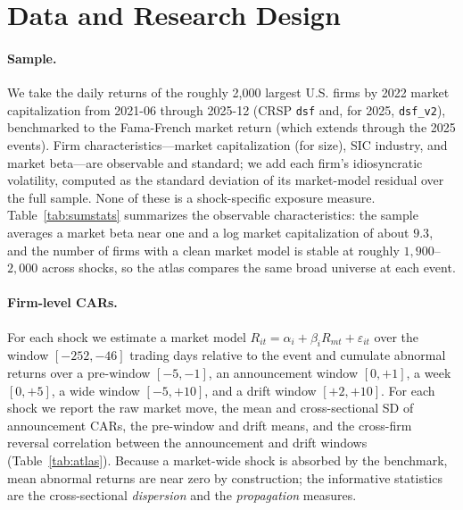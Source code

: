\documentclass[12pt]{article}
\begin{document}
\section{Data and Research Design}\label{sec:data}
\paragraph{Sample.} We take the daily returns of the roughly 2{,}000 largest U.S. firms by 2022
market capitalization from 2021-06 through 2025-12 (CRSP \texttt{dsf} and, for 2025,
\texttt{dsf\_v2}), benchmarked to the Fama-French market return (which extends through the 2025
events). Firm characteristics---market capitalization (for size), SIC industry, and market
beta---are observable and standard; we add each firm's idiosyncratic volatility, computed as the
standard deviation of its market-model residual over the full sample. None of these is a
shock-specific exposure measure. Table~\ref{tab:sumstats} summarizes the observable
characteristics: the sample averages a market beta near one and a log market capitalization of
about $9.3$, and the number of firms with a clean market model is stable at roughly $1{,}900$--$2{,}000$
across shocks, so the atlas compares the same broad universe at each event.

\paragraph{Firm-level CARs.} For each shock we estimate a market model
$R_{it}=\alpha_i+\beta_i R_{mt}+\varepsilon_{it}$ over the window $[-252,-46]$ trading days
relative to the event and cumulate abnormal returns over a pre-window $[-5,-1]$, an announcement
window $[0,+1]$, a week $[0,+5]$, a wide window $[-5,+10]$, and a drift window $[+2,+10]$. For each
shock we report the raw market move, the mean and cross-sectional SD of announcement CARs, the
pre-window and drift means, and the cross-firm reversal correlation between the announcement and
drift windows (Table~\ref{tab:atlas}). Because a market-wide shock is absorbed by the benchmark,
mean abnormal returns are near zero by construction; the informative statistics are the
cross-sectional \emph{dispersion} and the \emph{propagation} measures.
\end{document}
